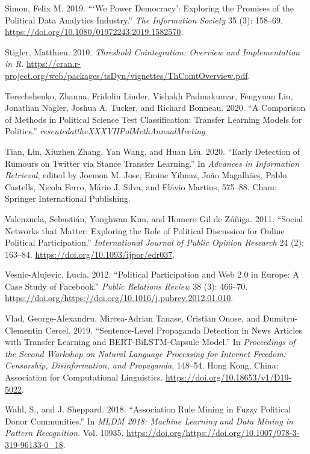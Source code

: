\documentclass[12pt,]{article}
\begin{document}
\leavevmode\hypertarget{ref-simon2019}{}%
Simon, Felix M. 2019. ```We Power Democracy': Exploring the Promises of
the Political Data Analytics Industry.'' \emph{The Information Society}
35 (3): 158--69. \url{https://doi.org/10.1080/01972243.2019.1582570}.

\leavevmode\hypertarget{ref-tsdyn}{}%
Stigler, Matthieu. 2010. \emph{Threshold Cointegration: Overview and
Implementation in R}.
\url{https://cran.r-project.org/web/packages/tsDyn/vignettes/ThCointOverview.pdf}.

\leavevmode\hypertarget{ref-terechshenko2020}{}%
Terechshenko, Zhanna, Fridolin Linder, Vishakh Padmakumar, Fengyuan Liu,
Jonathan Nagler, Joshua A. Tucker, and Richard Bonneau. 2020. ``A
Comparison of Methods in Political Science Test Classification: Transfer
Learning Models for Politics.''
\emph{resentedattheXXXVIIPolMethAnnualMeeting}.

\leavevmode\hypertarget{ref-tian2020}{}%
Tian, Lin, Xiuzhen Zhang, Yan Wang, and Huan Liu. 2020. ``Early
Detection of Rumours on Twitter via Stance Transfer Learning.'' In
\emph{Advances in Information Retrieval}, edited by Joemon M. Jose,
Emine Yilmaz, João Magalhães, Pablo Castells, Nicola Ferro, Mário J.
Silva, and Flávio Martins, 575--88. Cham: Springer International
Publishing.

\leavevmode\hypertarget{ref-valenzuela2011}{}%
Valenzuela, Sebastián, Yonghwan Kim, and Homero Gil de Zúñiga. 2011.
``Social Networks that Matter: Exploring the Role of Political
Discussion for Online Political Participation.'' \emph{International
Journal of Public Opinion Research} 24 (2): 163--84.
\url{https://doi.org/10.1093/ijpor/edr037}.

\leavevmode\hypertarget{ref-vesnic2012}{}%
Vesnic-Alujevic, Lucia. 2012. ``Political Participation and Web 2.0 in
Europe: A Case Study of Facebook.'' \emph{Public Relations Review} 38
(3): 466--70.
\url{https://doi.org/https://doi.org/10.1016/j.pubrev.2012.01.010}.

\leavevmode\hypertarget{ref-vlad2019}{}%
Vlad, George-Alexandru, Mircea-Adrian Tanase, Cristian Onose, and
Dumitru-Clementin Cercel. 2019. ``Sentence-Level Propaganda Detection in
News Articles with Transfer Learning and BERT-BiLSTM-Capsule Model.'' In
\emph{Proceedings of the Second Workshop on Natural Language Processing
for Internet Freedom: Censorship, Disinformation, and Propaganda},
148--54. Hong Kong, China: Association for Computational Linguistics.
\url{https://doi.org/10.18653/v1/D19-5022}.

\leavevmode\hypertarget{ref-wahl2018}{}%
Wahl, S., and J. Sheppard. 2018. ``Association Rule Mining in Fuzzy
Political Donor Communities.'' In \emph{MLDM 2018: Machine Learning and
Data Mining in Pattern Recognition}. Vol. 10935.
\url{https://doi.org/https://doi.org/10.1007/978-3-319-96133-0_18}.
\end{document}
